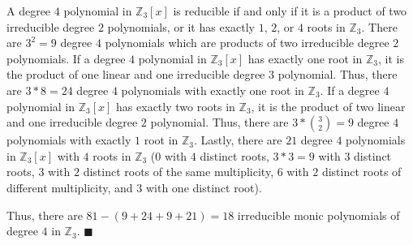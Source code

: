 \documentclass{article}
\begin{document}
A degree $4$ polynomial in $\mathbb{Z}_3[x]$ is reducible if and only if it is a product of two
irreducible degree $2$ polynomials, or it has exactly $1$, $2$, or $4$ roots
in $\mathbb{Z}_3$. There are $3^2 = 9$ degree $4$ polynomials which are
products of two irreducible degree $2$ polynomials. If a degree $4$ polynomial
in $\mathbb{Z}_3[x]$ has exactly one root in $\mathbb{Z}_3$, it is the product
of one linear and one irreducible degree $3$ polynomial. Thus, there are $3*8 = 24$
degree $4$ polynomials with exactly one root in $\mathbb{Z}_3$. If a degree
$4$ polynomial in $\mathbb{Z}_3[x]$ has exactly two roots in $\mathbb{Z}_3$,
it is the product of two linear and one irreducible degree $2$ polynomial.
Thus, there are $3*{3 \choose 2} = 9$
degree $4$ polynomials with exactly $1$ root in $\mathbb{Z}_3$. Lastly, there
are $21$ degree $4$ polynomials in $\mathbb{Z}_3[x]$ with
$4$ roots in $\mathbb{Z}_3$ ($0$ with $4$ distinct roots, $3*3 = 9$ with $3$
distinct roots, $3$ with $2$ distinct roots of the same multiplicity, $6$ with
$2$ distinct roots of different multiplicity, and $3$ with one distinct root).

Thus, there are $81 - (9 + 24 + 9 + 21) = 18$ irreducible monic polynomials of degree $4$
in $\mathbb{Z}_3$. \qquad $\blacksquare$ \\
\end{document}
